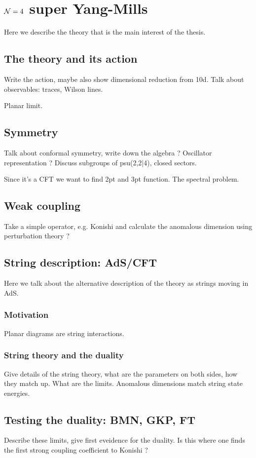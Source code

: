 
\section{$\mathcal{N}=4$ super Yang-Mills}

Here we describe the theory that is the main interest of the thesis.

\subsection{The theory and its action}

Write the action, maybe also show dimensional reduction from 10d. Talk about observables: traces, Wilson lines. 

Planar limit.

\subsection{Symmetry}

Talk about conformal symmetry, write down the algebra ? Oscillator representation ? Discuss subgroups of psu(2,2|4), closed sectors. 

Since it's a CFT we want to find 2pt and 3pt function. The spectral problem.

\subsection{Weak coupling}

Take a simple operator, e.g. Konishi and calculate the anomalous dimension using perturbation theory ?

\subsection{String description: AdS/CFT}

Here we talk about the alternative description of the theory as strings moving in AdS.

\subsubsection{Motivation}

Planar diagrams are string interactions.

\subsubsection{String theory and the duality}

Give details of the string theory, what are the parameters on both sides, how they match up. What are the limits. Anomalous dimensions match string state energies.

\subsection{Testing the duality: BMN, GKP, FT}

Describe these limits, give first eveidence for the duality. Is this where one finds the first strong coupling coefficient to Konishi ?